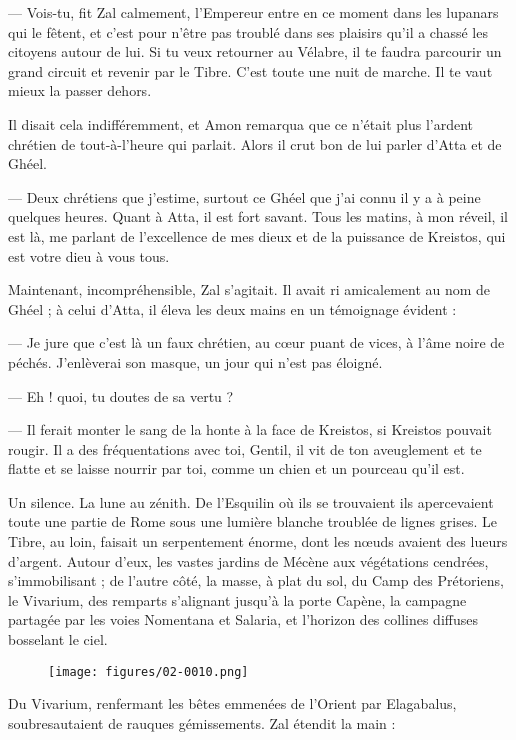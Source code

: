 \documentclass[a4paper, 11pt, oneside, polutonikogreek, french]{article}
\begin{document}
--- Vois-tu, fit Zal calmement, l'Empereur entre en ce moment dans les lupanars qui le fêtent, et c'est pour n'être pas troublé dans ses plaisirs qu'il a chassé les citoyens autour de lui. Si tu veux retourner au Vélabre, il te faudra parcourir un grand circuit et revenir par le Tibre. C'est toute une nuit de marche. Il te vaut mieux la passer dehors.

Il disait cela indifféremment, et Amon remarqua que ce n'était plus l'ardent chrétien de tout-à-l'heure qui parlait. Alors il crut bon de lui parler d'Atta et de Ghéel.

--- Deux chrétiens que j'estime, surtout ce Ghéel que j'ai connu il y a à peine quelques heures. Quant à Atta, il est fort savant. Tous les matins, à mon réveil, il est là, me parlant de l'excellence de mes dieux et de la puissance de Kreistos, qui est votre dieu à vous tous.

Maintenant, incompréhensible, Zal s'agitait. Il avait ri amicalement au nom de Ghéel ; à celui d'Atta, il éleva les deux mains en un témoignage évident :

--- Je jure que c'est là un faux chrétien, au cœur puant de vices, à l'âme noire de péchés. J'enlèverai son masque, un jour qui n'est pas éloigné.

--- Eh ! quoi, tu doutes de sa vertu ?

--- Il ferait monter le sang de la honte à la face de Kreistos, si Kreistos pouvait rougir. Il a des fréquentations avec toi, Gentil, il vit de ton aveuglement et te flatte et se laisse nourrir par toi, comme un chien et un pourceau qu'il est.

Un silence. La lune au zénith. De l'Esquilin où ils se trouvaient ils apercevaient toute une partie de Rome sous une lumière blanche troublée de lignes grises. Le Tibre, au loin, faisait un serpentement énorme, dont les nœuds avaient des lueurs d'argent. Autour d'eux, les vastes jardins de Mécène aux végétations cendrées, s'immobilisant ; de l'autre côté, la masse, à plat du sol, du Camp des Prétoriens, le Vivarium, des remparts s'alignant jusqu'à la porte Capène, la campagne partagée par les voies Nomentana et Salaria, et l'horizon des collines diffuses bosselant le ciel.
\begin{figure}[H]
\centering
\texttt{[image: figures/02-0010.png]}
\end{figure}
Du Vivarium, renfermant les bêtes emmenées de l'Orient par Elagabalus, soubresautaient de rauques gémissements. Zal étendit la main :
\end{document}
